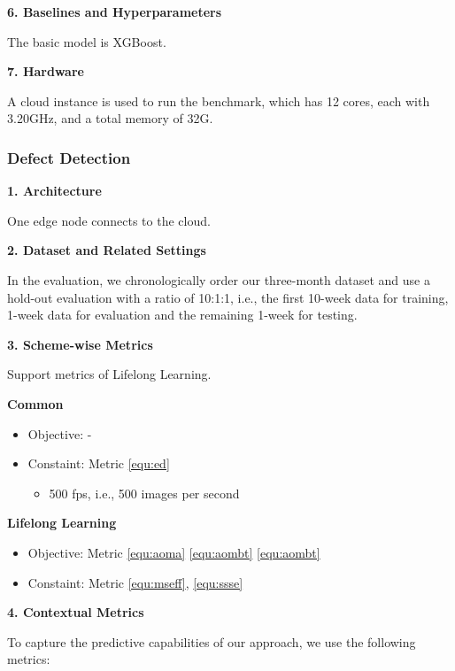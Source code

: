 \noindent
\textbf{6. Baselines and Hyperparameters}

The basic model is XGBoost.

\noindent
\textbf{7. Hardware}

A cloud instance is used to run the benchmark, which has 12 cores, each with 3.20GHz, and a total memory of 32G.


 
\vspace{0.2cm} \noindent
\subsubsection{Defect Detection}

\noindent
\textbf{1. Architecture}

One edge node connects to the cloud. 

\noindent
\textbf{2. Dataset and Related Settings}

In the evaluation, we chronologically order our three-month dataset and use a hold-out evaluation with a ratio of 10:1:1, i.e., the first 10-week data for training, 1-week data for evaluation and the remaining 1-week for testing.

\noindent
\textbf{3. Scheme-wise Metrics}

Support metrics of Lifelong Learning. 

\vspace{0.2cm}
\noindent \textbf{Common}
\begin{itemize}
    \item Objective: - 
    \item Constaint: Metric \ref{equ:ed}
        \begin{itemize} 
        \item 500 fps, i.e., 500 images per second 
        \end{itemize}
\end{itemize}

\vspace{0.2cm}
\noindent \textbf{Lifelong Learning}
\begin{itemize}
    \item Objective: Metric \ref{equ:aoma} \ref{equ:aombt} \ref{equ:aombt} 
    \item Constaint: Metric \ref{equ:mseff}, \ref{equ:ssse}  
\end{itemize}

\noindent
\textbf{4. Contextual Metrics}

To capture the predictive capabilities of our approach, we use the following metrics: 


